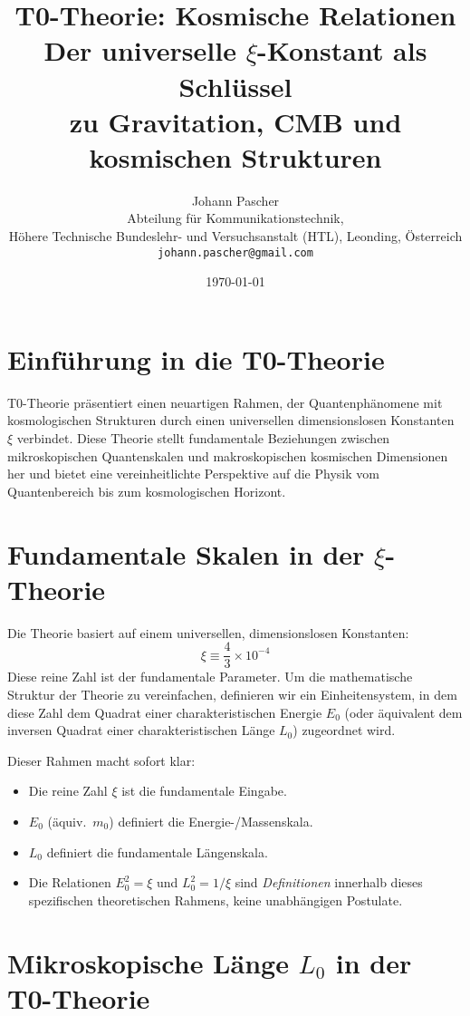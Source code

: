 \documentclass[12pt,a4paper]{article}
\title{\Huge\textbf{T0-Theorie: Kosmische Relationen}\\
	\Large Der universelle $\xi$-Konstant als Schlüssel \\ zu Gravitation, CMB und kosmischen Strukturen}
\author{\Large Johann Pascher\\
	Abteilung für Kommunikationstechnik,\\
	Höhere Technische Bundeslehr- und Versuchsanstalt (HTL), Leonding, Österreich\\
	\texttt{johann.pascher@gmail.com}}
\date{\today}
\numberwithin{equation}{section}
\begin{document}
	
	\maketitle
	\thispagestyle{fancy}
	
	\tableofcontents
	
	\section{Einführung in die T0-Theorie}
	
	T0-Theorie präsentiert einen neuartigen Rahmen, der Quantenphänomene mit kosmologischen Strukturen durch einen universellen dimensionslosen Konstanten $\xi$ verbindet. Diese Theorie stellt fundamentale Beziehungen zwischen mikroskopischen Quantenskalen und makroskopischen kosmischen Dimensionen her und bietet eine vereinheitlichte Perspektive auf die Physik vom Quantenbereich bis zum kosmologischen Horizont.
	
	\section{Fundamentale Skalen in der $\xi$-Theorie}
	
	Die Theorie basiert auf einem universellen, dimensionslosen Konstanten:
	\[
	\xi \equiv \frac{4}{3} \times 10^{-4}
	\]
	Diese reine Zahl ist der fundamentale Parameter. Um die mathematische Struktur der Theorie zu vereinfachen, definieren wir ein Einheitensystem, in dem diese Zahl dem Quadrat einer charakteristischen Energie $E_0$ (oder äquivalent dem inversen Quadrat einer charakteristischen Länge $L_0$) zugeordnet wird.
	
	Dieser Rahmen macht sofort klar:
	\begin{itemize}
		\item Die reine Zahl $\xi$ ist die fundamentale Eingabe.
		\item $E_0$ (äquiv.\ $m_0$) definiert die Energie-/Massenskala.
		\item $L_0$ definiert die fundamentale Längenskala.
		\item Die Relationen $E_0^2 = \xi$ und $L_0^2 = 1/\xi$ sind \textit{Definitionen} innerhalb dieses spezifischen theoretischen Rahmens, keine unabhängigen Postulate.
	\end{itemize}
	
	\section{Mikroskopische Länge $L_0$ in der T0-Theorie}
	
\end{document}
